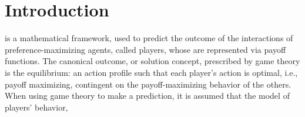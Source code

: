 \section{Introduction}



 is a  mathematical framework, used to predict the outcome of the interactions of preference-maximizing agents, called players, whose    are represented via payoff functions.
The canonical outcome, or solution concept, prescribed by game theory is the equilibrium: an action profile such that each player's action is optimal, i.e., payoff maximizing, contingent on the payoff-maximizing behavior of the others.
When using game theory to make a prediction, it is assumed that the model of players' behavior,
